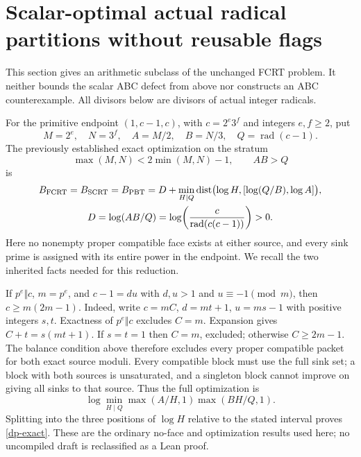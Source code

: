 \section{Scalar-optimal actual radical partitions without reusable flags}
\label{dp-section}

This section gives an arithmetic subclass of the unchanged FCRT problem.
It neither bounds the scalar ABC defect from above nor constructs an ABC
counterexample. All divisors below are divisors of actual integer radicals.

For the primitive endpoint \((1,c-1,c)\), with
\(c=2^e3^f\) and integers \(e,f\ge2\), put
\[
 M=2^e,\quad N=3^f,\quad A=M/2,\quad B=N/3,
 \quad Q=\operatorname{rad}(c-1).
\]
The previously established exact optimization on the stratum
\[
 \max(M,N)<2\min(M,N)-1,\qquad AB>Q
\]
is
\begin{gather}
 B_{\rm FCRT}=B_{\rm SCRT}=B_{\rm PBT}
 =D+\min_{H\mid Q}\operatorname{dist}
       \bigl(\log H,[\log(Q/B),\log A]\bigr),\label{dp-exact}\\
 D=\log(AB/Q)=\log\!\left(\frac{c}{\operatorname{rad}(c(c-1))}\right)>0.
 \label{dp-defect}
\end{gather}
Here no nonempty proper compatible face exists at either source, and
every sink prime is assigned with its entire power in the endpoint.
We recall the two inherited facts needed for this reduction.

If \(p^e\Vert c\), \(m=p^e\), and \(c-1=du\) with \(d,u>1\)
and \(u\equiv-1\pmod m\), then \(c\ge m(2m-1)\).
Indeed, write \(c=mC\), \(d=mt+1\), \(u=ms-1\) with positive
integers \(s,t\). Exactness of \(p^e\Vert c\) excludes \(C=m\).
Expansion gives \(C+t=s(mt+1)\). If \(s=t=1\) then \(C=m\),
excluded; otherwise \(C\ge2m-1\). The balance condition above
therefore excludes every proper compatible packet for both exact source
moduli. Every compatible block must use the full sink set; a block with
both sources is unsaturated, and a singleton block cannot improve on
giving all sinks to that source. Thus the full optimization is
\[
 \log\min_{H\mid Q}\max(A/H,1)\max(BH/Q,1).
\]
Splitting into the three positions of \(\log H\) relative to the stated
interval proves \eqref{dp-exact}. These are the ordinary no-face and
optimization results used here; no uncompiled draft is reclassified as
a Lean proof.

